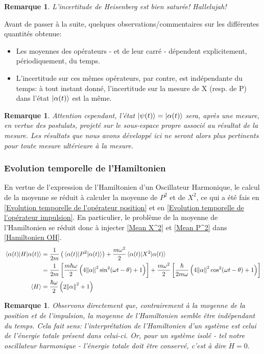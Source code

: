 \documentclass[11pt,oneside,a4paper]{article}
\newcommand{\h}{\ensuremath{\hbar}}
\newtheorem{remark}[theorem]{Remarque}
\begin{document}
\begin{remark}
  L'incertitude de Heisenberg est bien saturée! Hallelujah!
\end{remark}

Avant de passer à la suite, quelques observations/commentaires sur les différentes quantités obtenue:
\begin{itemize}
  \item Les moyennes des opérateurs - et de leur carré - dépendent explicitement, périodiquement, du temps. 
  \item L'incertitude sur ces mêmes opérateurs, par contre, est indépendante du temps: à tout instant donné, l'incertitude sur la mesure de X (resp. de P) dans l'état $\ket{\alpha(t)}$ est la même.
\end{itemize}

\begin{remark}
  Attention cependant, l'état $\ket{\psi(t)} = \ket{\alpha(t)}$ sera, après une mesure, en vertue des postulats, projeté sur le sous-espace propre associé au résultat de la mesure. Les résultats que nous avons développé ici ne seront alors plus pertinents pour toute mesure ultérieure à la mesure.
\end{remark}

\subsubsection{Evolution temporelle de l'Hamiltonien}

En vertue de l'expression de l'Hamiltonien d'un Oscillateur Harmonique, le calcul de la moyenne se réduit à calculer la moyenne de $P^2$ et de $X^2$, ce qui a été fais en \ref{Evolution temporelle de l'opérateur position} et en \ref{Evolution temporelle de l'opérateur impulsion}. En particulier, le problème de la moyenne de l'Hamiltonien se réduit donc à injecter \eqref{Mean X^2} et \eqref{Mean P^2} dans \eqref{Hamiltonien OH}.
\begin{align}
  \expval{H}{\alpha(t)} &= \frac{1}{2m}\left(\expval{P^2}{\alpha(t)}\right) + \frac{m\omega^2}{2}\expval{X^2}{\alpha(t)}\\
  &= \frac{1}{2m} \left[\frac{m\h\omega}{2}\left(4\norm{\alpha}^2\sin^2(\omega t-\theta)+1\right)\right] + \frac{m\omega^2}{2}\left[\frac{\h}{2m\omega}\left(4\norm{\alpha}^2\cos^2(\omega t-\theta)+1\right)\right]\\
  \expval{H} &= \frac{\h\omega}{2}\left(2\norm{\alpha}^2+1\right)
\end{align}
\begin{remark}
  Observons directement que, contrairement à la moyenne de la position et de l'impulsion, la moyenne de l'Hamiltonien semble être indépendant du temps. Cela fait sens: l'interprétation de l'Hamiltonien d'un système est celui de l'énergie totale présent dans celui-ci. Or, pour un système isolé - tel notre oscillateur harmonique - l'énergie totale doit être conservé, c'est à dire $\dot{H} = 0$.
\end{remark}
\end{document}
